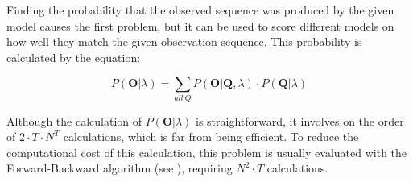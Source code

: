 Finding the probability that the observed sequence was produced by the given model causes the first problem, but it can be used to score different models on how well they match the given observation sequence. This probability is calculated by the equation:

\begin{equation}
P(\mathbf{O}|\lambda) = \sum_{all \ Q} P(\mathbf{O}|\mathbf{Q},\lambda) \cdot P(\mathbf{Q}|\lambda)
\end{equation}

Although the calculation of $P(\mathbf{O}|\lambda)$ is straightforward, it involves on the order of $2 \cdot T \cdot N^{T}$ calculations, which is far from being efficient.
%
To reduce the computational cost of this calculation, this problem is usually evaluated with the Forward-Backward algorithm (see \cite{rabiner89}), requiring $N^{2} \cdot T $ calculations.

